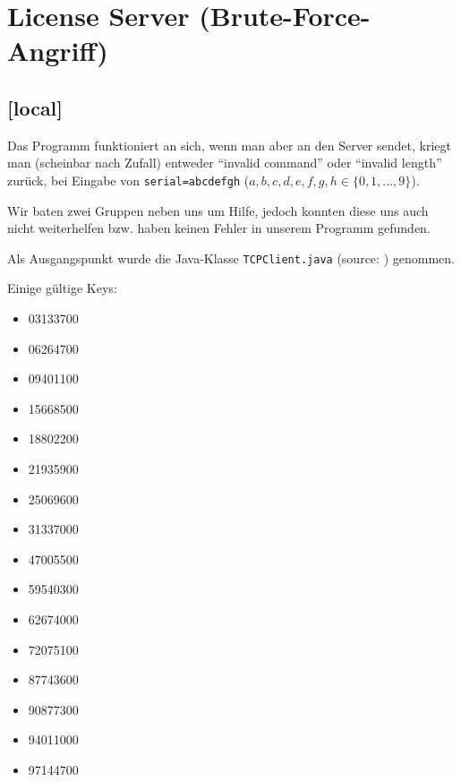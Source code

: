 \documentclass[twoside]{article}
\newcommand{\say}[1]{%
	``#1''%
}
\newcommand{\ttt}[1]{%
	\texttt{#1}%
}
\begin{document}
\section{License Server (Brute-Force-Angriff)}
\subsection{[local]}
Das Programm funktioniert an sich, wenn man aber an den Server sendet, kriegt man (scheinbar nach Zufall) entweder \say{invalid command} oder \say{invalid length} zurück, bei Eingabe von \ttt{serial=abcdefgh} ($a,b,c,d,e,f,g,h \in \{0,1,...,9\}$).

Wir baten zwei Gruppen neben uns um Hilfe, jedoch konnten diese uns auch nicht weiterhelfen bzw. haben keinen Fehler in unserem Programm gefunden.

Als Ausgangspunkt wurde die Java-Klasse \ttt{TCPClient.java} (source: \cite{javatcp}) genommen.

Einige gültige Keys:\\
\begin{center}
\begin{minipage}[t]{0.23\textwidth}
	\begin{itemize}
		\item 03133700
		\item 06264700
		\item 09401100
		\item 15668500
	\end{itemize}
\end{minipage}
\begin{minipage}[t]{0.23\textwidth}
	\begin{itemize}
		\item 18802200
		\item 21935900
		\item 25069600
		\item 31337000
	\end{itemize}
\end{minipage}
\begin{minipage}[t]{0.23\textwidth}
	\begin{itemize}
		\item 47005500
		\item 59540300
		\item 62674000
		\item 72075100
	\end{itemize}
\end{minipage}
\begin{minipage}[t]{0.23\textwidth}
	\begin{itemize}
		\item 87743600
		\item 90877300
		\item 94011000
		\item 97144700
	\end{itemize}
\end{minipage}
\end{center}
\end{document}
